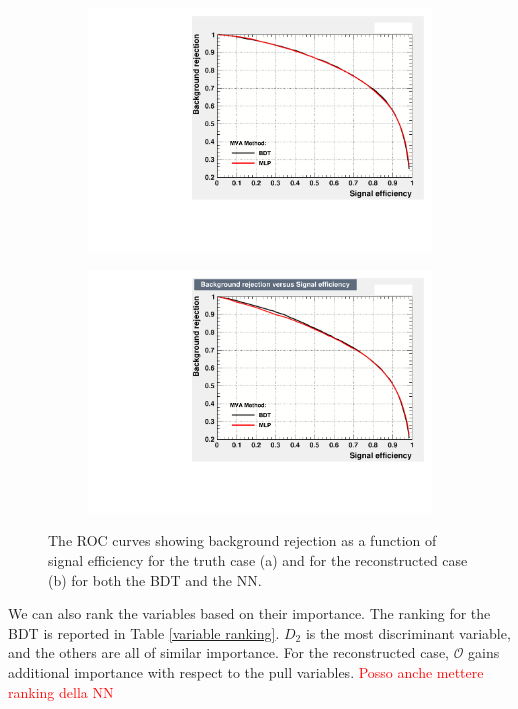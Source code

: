 \documentclass[10pt,a4paper]{book}
\newcommand\todo[1]{\textcolor{red}{#1}}
\begin{document}
\begin{figure}[h]
\begin{subfigure}{1.0\textwidth}
\centering
\includegraphics[scale=0.7]{truth/roc}
\caption{}
\end{subfigure}
\begin{subfigure}{1.0\textwidth}
\centering
\includegraphics[scale=0.7]{reco/roc}
\caption{}
\end{subfigure}
\caption{The ROC curves showing background rejection as a function of signal efficiency for the truth case (a) and for the reconstructed case (b) for both the BDT and the NN.}
\label{ROC curves}
\end{figure} 

We can also rank the variables based on their importance. The ranking for the BDT is reported in Table \ref{variable ranking}. $D_2$ is the most discriminant variable, and the others are all of similar importance. For the reconstructed case, $\mathcal{O}$ gains additional importance with respect to the pull variables. \todo{Posso anche mettere ranking della NN}
\end{document}
